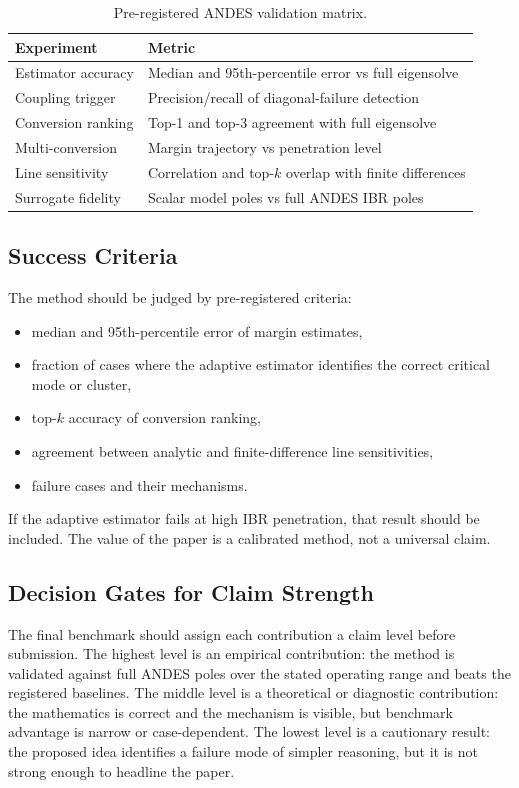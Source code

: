 \documentclass[journal]{IEEEtran}
\begin{document}
\begin{table}[t]
\centering
\caption{Pre-registered ANDES validation matrix.}
\label{tab:andes}
\begin{tabular}{p{}p{}}
\toprule
Experiment & Metric\\
\midrule
Estimator accuracy & Median and 95th-percentile error vs full eigensolve\\
Coupling trigger & Precision/recall of diagonal-failure detection\\
Conversion ranking & Top-1 and top-3 agreement with full eigensolve\\
Multi-conversion & Margin trajectory vs penetration level\\
Line sensitivity & Correlation and top-$k$ overlap with finite differences\\
Surrogate fidelity & Scalar model poles vs full ANDES IBR poles\\
\bottomrule
\end{tabular}
\end{table}

\subsection{Success Criteria}

The method should be judged by pre-registered criteria:
\begin{itemize}
\item median and 95th-percentile error of margin estimates,
\item fraction of cases where the adaptive estimator identifies the correct critical mode or cluster,
\item top-$k$ accuracy of conversion ranking,
\item agreement between analytic and finite-difference line sensitivities,
\item failure cases and their mechanisms.
\end{itemize}
If the adaptive estimator fails at high IBR penetration, that result should be included. The value of the paper is a calibrated method, not a universal claim.

\subsection{Decision Gates for Claim Strength}

The final benchmark should assign each contribution a claim level before submission. The highest level is an empirical contribution: the method is validated against full ANDES poles over the stated operating range and beats the registered baselines. The middle level is a theoretical or diagnostic contribution: the mathematics is correct and the mechanism is visible, but benchmark advantage is narrow or case-dependent. The lowest level is a cautionary result: the proposed idea identifies a failure mode of simpler reasoning, but it is not strong enough to headline the paper.
\end{document}
